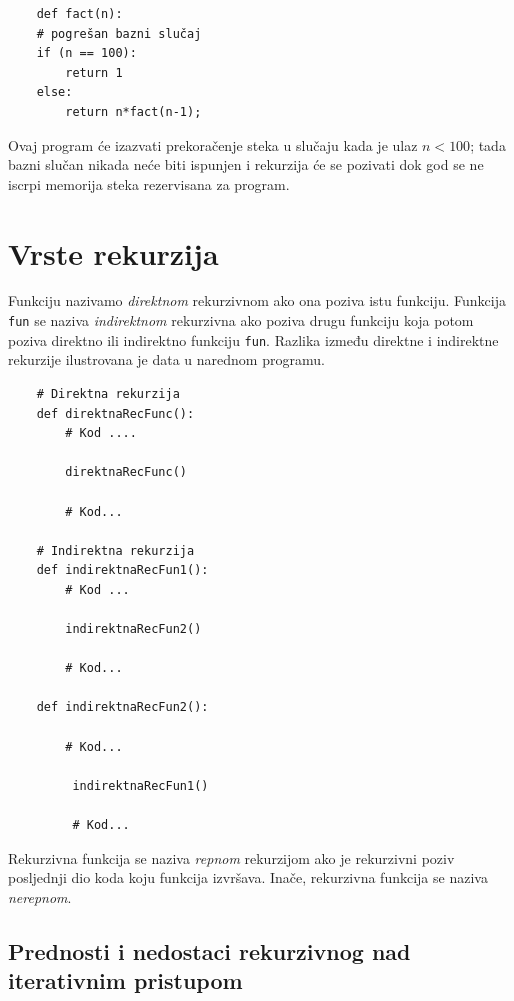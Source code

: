 \begin{verbatim}
	def fact(n):
	# pogrešan bazni slučaj 
	if (n == 100): 
	    return 1	
	else:
	    return n*fact(n-1);
\end{verbatim}

Ovaj program će izazvati prekoračenje steka u slučaju kada je ulaz $n<100$;  tada bazni slučan nikada neće biti ispunjen i rekurzija će se pozivati dok god se ne iscrpi memorija steka rezervisana za program.

\section{Vrste rekurzija}

Funkciju  nazivamo \textit{direktnom} rekurzivnom ako ona poziva istu funkciju. Funkcija \texttt{fun} se naziva \textit{indirektnom} rekurzivna ako poziva drugu funkciju koja potom poziva direktno ili indirektno funkciju \texttt{fun}. Razlika između direktne i indirektne rekurzije ilustrovana je data u narednom programu.

\begin{verbatim}
	# Direktna rekurzija
	def direktnaRecFunc():
	    # Kod ....
	
	    direktnaRecFunc()
	
	    # Kod...
	
	# Indirektna rekurzija
	def indirektnaRecFun1():
	    # Kod ...
	
	    indirektnaRecFun2()
	
	    # Kod...
	
	def indirektnaRecFun2():
	
	    # Kod...
	
	     indirektnaRecFun1()
	
	     # Kod...
\end{verbatim}



Rekurzivna funkcija se naziva \textit{repnom} rekurzijom ako je rekurzivni poziv posljednji dio koda koju funkcija izvršava. Inače, rekurzivna funkcija se naziva \textit{nerepnom}.
 
\subsection{Prednosti i nedostaci rekurzivnog nad iterativnim pristupom}

